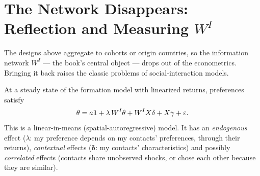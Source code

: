 \documentclass[../structural_economics_book.tex]{subfiles}
\begin{document}
\section{The Network Disappears: Reflection and Measuring $W^I$}
\label{ch11:sec:network}

The designs above aggregate to cohorts or origin countries, so the information network $W^I$ --- the book's central object --- drops out of the econometrics. Bringing it back raises the classic problems of social-interaction models.

At a steady state of the formation model with linearized returns, preferences satisfy
\[
\theta = a\mathbf{1} + \lambda\,W^I\theta + W^I X\delta + X\gamma + \varepsilon.
\]
This is a linear-in-means (spatial-autoregressive) model. It has an \textit{endogenous} effect ($\lambda$: my preference depends on my contacts' preferences, through their returns), \textit{contextual} effects ($\boldsymbol{\delta}$: my contacts' characteristics) and possibly \textit{correlated} effects (contacts share unobserved shocks, or chose each other because they are similar).
\end{document}
